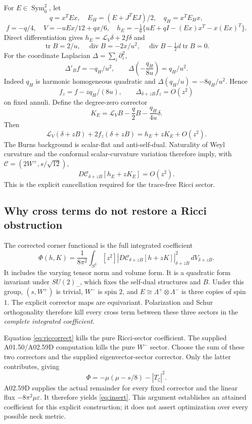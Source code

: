 \documentclass[11pt,a4paper]{article}
\theoremstyle{remark}\newtheorem{remark}[theorem]{Remark}
\newcommand{\tr}{\operatorname{tr}}
\newcommand{\cC}{\mathscr C}
\newcommand{\eps}{\varepsilon}
\begin{document}
For $E\in\operatorname{Sym}^2_0$, let
\[
 q=x^TEx,\quad E_H=(E+J^TEJ)/2,\quad q_H=x^TE_Hx,
\]
\[
 f=-q/4,\quad V=-uEx/12+qx/6,\quad
 h_E=-\tfrac16\{uE+qI-(Ex)x^T-x(Ex)^T\}.
\]
Direct differentiation gives $h_E=\mathcal L_V\delta+2f\delta$ and
\[
 \tr B=2/u,\quad \operatorname{div}B=-2x/u^2,
 \quad \operatorname{div}B-\tfrac12d\tr B=0.
\]
For the coordinate Laplacian $\Delta=\sum_i\partial_i^2$,
\[
 \Delta'_B f=-q_H/u^2,\qquad
 \Delta\left(-\frac{q_H}{8u}\right)=q_H/u^2.
\]
Indeed $q_H$ is harmonic homogeneous quadratic and
$\Delta(q_H/u)=-8q_H/u^2$. Hence
\[
 f_z=f-zq_H/(8u),\qquad \Delta_{\delta+zB}f_z=O(z^2)
\]
on fixed annuli. Define the degree-zero corrector
\[
 K_E=\mathcal L_VB-\frac q2B-\frac{q_H}{4u}\delta.
\]
Then
\[
 \mathcal L_V(\delta+zB)+2f_z(\delta+zB)
 =h_E+zK_E+O(z^2).
\]
The Burns background is scalar-flat and anti-self-dual. Naturality of Weyl curvature and the conformal scalar-curvature variation therefore imply, with
$\cC=(2W^+,s/\sqrt{12})$,
\begin{equation}
 D\cC_{\delta+zB}[h_E+zK_E]=O(z^2).\label{eq:riccorrect}
\end{equation}
This is the explicit cancellation required for the trace-free Ricci sector.

\subsection{Why cross terms do not restore a Ricci obstruction}
The corrected corner functional is the full integrated coefficient
\[
 \Phi(h,K)=\frac1{8\pi^2}\int_{S^3}[z^2]
 |D\cC_{\delta+zB}[h+zK]|^2_{\delta+zB}\,dV_{\delta+zB}.
\]
It includes the varying tensor norm and volume form. It is a quadratic form invariant under $SU(2)_-$, which fixes the self-dual structures and $B$.
Under this group, $(s,W^+)$ is trivial, $W^-$ is spin $2$, and
$E\cong\Lambda^+\otimes\Lambda^-$ is three copies of spin $1$.
The explicit corrector maps are equivariant. Polarization and Schur orthogonality therefore kill every cross term between these three sectors in the \emph{complete integrated coefficient}.

Equation \eqref{eq:riccorrect} kills the pure Ricci-sector coefficient. The supplied A01.50/A02.59D computation kills the pure $W^-$ sector. Choose the sum of these two correctors and the supplied eigenvector-sector corrector. Only the latter contributes, giving
\[
 \Phi=-\mu(\mu-s/8)-|T_\zeta|^2.
\]
A02.59D supplies the actual remainder for every fixed corrector and the linear flux $-8\pi^2\mu\eps$. It therefore yields \eqref{eq:insert}. This argument establishes an attained coefficient for this explicit construction; it does not assert optimization over every possible neck metric.
\end{document}
